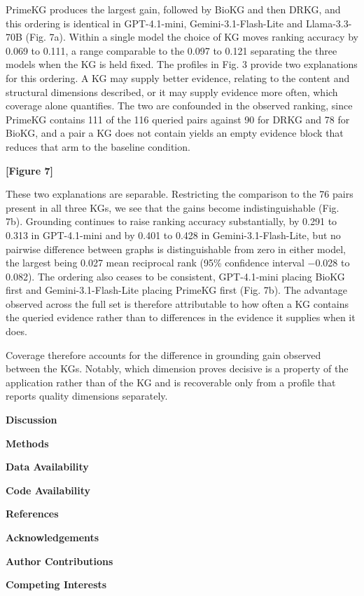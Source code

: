 PrimeKG produces the largest gain, followed by BioKG and then DRKG, and this ordering is identical in GPT-4.1-mini, Gemini-3.1-Flash-Lite and Llama-3.3-70B (Fig. 7a). Within a single model the choice of KG moves ranking accuracy by 0.069 to 0.111, a range comparable to the 0.097 to 0.121 separating the three models when the KG is held fixed. The profiles in Fig. 3 provide two explanations for this ordering. A KG may supply better evidence, relating to the content and structural dimensions described, or it may supply evidence more often, which coverage alone quantifies. The two are confounded in the observed ranking, since PrimeKG contains 111 of the 116 queried pairs against 90 for DRKG and 78 for BioKG, and a pair a KG does not contain yields an empty evidence block that reduces that arm to the baseline condition.

\textbf{{[}Figure 7{]}}

These two explanations are separable. Restricting the comparison to the 76 pairs present in all three KGs, we see that the gains become indistinguishable (Fig. 7b). Grounding continues to raise ranking accuracy substantially, by 0.291 to 0.313 in GPT-4.1-mini and by 0.401 to 0.428 in Gemini-3.1-Flash-Lite, but no pairwise difference between graphs is distinguishable from zero in either model, the largest being 0.027 mean reciprocal rank (95\% confidence interval −0.028 to 0.082). The ordering also ceases to be consistent, GPT-4.1-mini placing BioKG first and Gemini-3.1-Flash-Lite placing PrimeKG first (Fig. 7b). The advantage observed across the full set is therefore attributable to how often a KG contains the queried evidence rather than to differences in the evidence it supplies when it does.

Coverage therefore accounts for the difference in grounding gain observed between the KGs. Notably, which dimension proves decisive is a property of the application rather than of the KG and is recoverable only from a profile that reports quality dimensions separately.

\textbf{Discussion}

\textbf{Methods}

\textbf{Data Availability}

\textbf{Code Availability}

\textbf{References}

\textbf{Acknowledgements}

\textbf{Author Contributions}

\textbf{Competing Interests}


